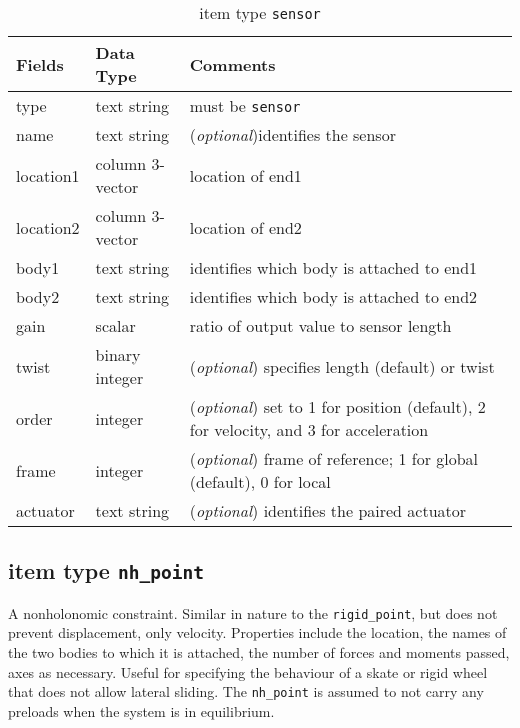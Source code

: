 \begin{table}[!h]
\caption{item type \texttt{sensor}}
\label{sensor}
\begin{center}
\begin{tabular}{lll}
\toprule
Fields & Data Type & Comments\\
\midrule
type & text string & must be \texttt{sensor}\\
name & text string & (\emph{optional})identifies the sensor\\
location1 & column 3-vector & location of end1\\
location2 & column 3-vector & location of end2\\
body1 & text string & identifies which body is attached to end1\\
body2 & text string & identifies which body is attached to end2\\
gain & scalar & ratio of output value to sensor length\\
twist & binary integer & (\emph{optional}) specifies length (default) or twist \\
order & integer & (\emph{optional}) set to 1 for position (default), 2 for velocity, and 3 for acceleration\\
frame & integer & (\emph{optional}) frame of reference; 1 for global (default), 0 for local\\
actuator & text string & (\emph{optional}) identifies the paired actuator\\
\bottomrule
\end{tabular}
\end{center}
\end{table}
\clearpage

\subsection{item type \texttt{nh\_point}}
A nonholonomic constraint.  Similar in nature to the \texttt{rigid\_point}, but does not prevent displacement, only velocity.  Properties include the location, the names of the two bodies to which it is attached, the number of forces and moments passed, axes as necessary.  Useful for specifying the behaviour of a skate or rigid wheel that does not allow lateral sliding.  The \texttt{nh\_point} is assumed to not carry any preloads when the system is in equilibrium.

